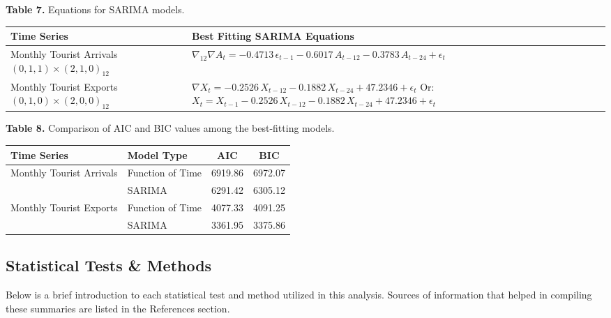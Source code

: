 \documentclass[11pt]{article}
\begin{document}
\begin{center}
\textbf{Table 7.} Equations for SARIMA models.
\smallskip

\begin{tabular}{@{}p{} p{}@{}}
\toprule
\textbf{Time Series} & \textbf{Best Fitting SARIMA Equations} \\
\midrule
Monthly Tourist Arrivals \newline $(0,1,1)\times(2,1,0)_{12}$ & $\nabla_{12}\nabla A_{t} = -0.4713\,\epsilon_{t-1} - 0.6017\,A_{t-12} - 0.3783\,A_{t-24} + \epsilon_{t}$ \\[0.8em]
Monthly Tourist Exports \newline $(0,1,0)\times(2,0,0)_{12}$ & $\nabla X_{t} = -0.2526\,X_{t-12} - 0.1882\,X_{t-24} + 47.2346 + \epsilon_{t}$ \newline Or: \newline $X_{t} = X_{t-1} - 0.2526\,X_{t-12} - 0.1882\,X_{t-24} + 47.2346 + \epsilon_{t}$ \\
\bottomrule
\end{tabular}
\end{center}
\bigskip

\begin{center}
\textbf{Table 8.} Comparison of AIC and BIC values among the best-fitting models.
\smallskip

\begin{tabular}{@{}l l c c@{}}
\toprule
\textbf{Time Series} & \textbf{Model Type} & \textbf{AIC} & \textbf{BIC} \\
\midrule
\multirow{2}{*}{Monthly Tourist Arrivals} & Function of Time & 6919.86 & 6972.07 \\
 & SARIMA & 6291.42 & 6305.12 \\
\multirow{2}{*}{Monthly Tourist Exports} & Function of Time & 4077.33 & 4091.25 \\
 & SARIMA & 3361.95 & 3375.86 \\
\bottomrule
\end{tabular}
\end{center}
\bigskip

\subsection{Statistical Tests \& Methods}

Below is a brief introduction to each statistical test and method utilized in this analysis. Sources of information that helped in compiling these summaries are listed in the References section.
\end{document}
